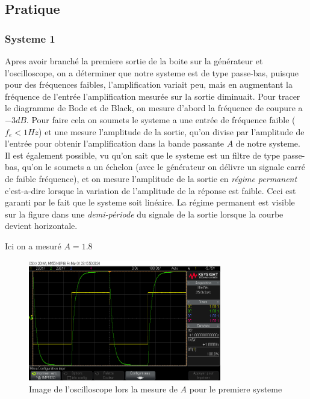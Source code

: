 \documentclass[12pt, a4paper]{report}
\begin{document}
\subsection{Pratique}
\subsubsection{Systeme 1}

Apres avoir branché la premiere sortie de la boite sur la générateur et l'oscilloscope, on a déterminer que
notre systeme est de type passe-bas, puisque pour des fréquences faibles, l'amplification variait peu, mais en augmentant
la fréquence de l'entrée l'amplification mesurée sur la sortie diminuait. Pour tracer le diagramme de 
Bode et de Black, on mesure d'abord la fréquence de coupure a $-3 dB$. Pour faire cela on soumets le systeme a 
une entrée de fréquence faible ($f_e < 1 Hz$) et une mesure l'amplitude de la sortie, qu'on divise par l'amplitude 
de l'entrée pour obtenir l'amplification dans la bande passante $A$ de notre systeme. Il est également possible, 
vu qu'on sait que le systeme est un filtre de type passe-bas, qu'on le soumets a un échelon
(avec le générateur on délivre un signale carré de faible fréquence), et on mesure l'amplitude de  
la sortie en \textit{régime permanent} c'est-a-dire lorsque la variation de l'amplitude de la réponse 
est faible. Ceci est garanti par le fait que le systeme soit linéaire. La régime permanent est visible sur la figure %
dans une \textit{demi-période} du signale de la sortie lorsque la courbe devient horizontale.
\par

\pagebreak

Ici on a mesuré $A = 1.8$

\begin{figure}[h]
    \centering
    \includegraphics[width=0.75\textwidth]{mesureA1.png}
    \caption{Image de l'oscilloscope lors la mesure de $A$ pour le premiere systeme}
    \label{fig:mesureA1}
\end{figure}
\end{document}
